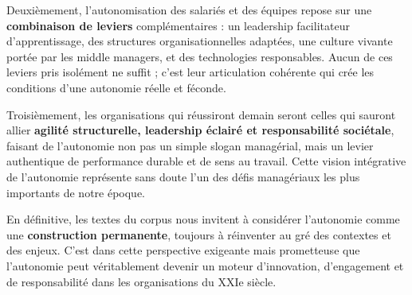 \documentclass{rapportECL}
\begin{document}
Deuxièmement, l'autonomisation des salariés et des équipes repose sur une \textbf{combinaison de leviers} complémentaires : un leadership facilitateur d'apprentissage, des structures organisationnelles adaptées, une culture vivante portée par les middle managers, et des technologies responsables. Aucun de ces leviers pris isolément ne suffit ; c'est leur articulation cohérente qui crée les conditions d'une autonomie réelle et féconde.

Troisièmement, les organisations qui réussiront demain seront celles qui sauront allier \textbf{agilité structurelle, leadership éclairé et responsabilité sociétale}, faisant de l'autonomie non pas un simple slogan managérial, mais un levier authentique de performance durable et de sens au travail. Cette vision intégrative de l'autonomie représente sans doute l'un des défis managériaux les plus importants de notre époque.

En définitive, les textes du corpus nous invitent à considérer l'autonomie comme une \textbf{construction permanente}, toujours à réinventer au gré des contextes et des enjeux. C'est dans cette perspective exigeante mais prometteuse que l'autonomie peut véritablement devenir un moteur d'innovation, d'engagement et de responsabilité dans les organisations du XXIe siècle.
\end{document}
